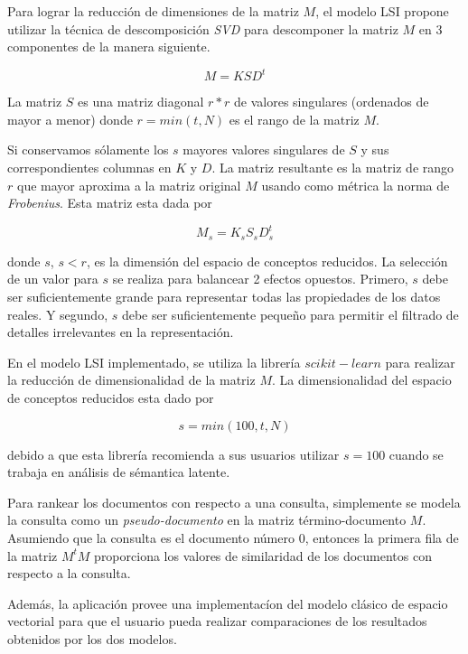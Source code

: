\documentclass[a4paper, 10pt]{article}
\begin{document}
	Para lograr la reducci\'on de dimensiones de la matriz $M$, el modelo LSI propone utilizar la 
	t\'ecnica de descomposici\'on \textit{SVD} para descomponer la matriz $M$ en 3 componentes de la manera siguiente.

	\begin{equation}
		M = KSD^t
	\end{equation}
	
	La matriz $S$ es una matriz diagonal $r*r$ de valores singulares (ordenados de mayor a menor) donde $r = min(t, N)$ es el rango de la matriz $M$.
	
	Si conservamos s\'olamente los $s$ mayores valores singulares de $S$ y sus correspondientes columnas en $K$ y $D$.
	La matriz resultante es la matriz de rango $r$ que mayor aproxima a la matriz original $M$ usando como m\'etrica la
    norma de \textit{Frobenius}. Esta matriz esta dada por
	
	\begin{equation}		
		M_s = K_sS_sD^t_s
	\end{equation}

	donde $s$, $s < r$, es la dimensión del espacio de conceptos reducidos. La selecci\'on de un valor para $s$ se
	realiza para balancear 2 efectos opuestos. Primero, $s$ debe ser suficientemente grande para representar todas las propiedades
	de los datos reales. Y segundo, $s$ debe ser suficientemente peque\~no para permitir el filtrado de detalles irrelevantes
	en la representaci\'on.

	En el modelo LSI implementado, se utiliza la librer\'ia $scikit-learn$ para realizar la reducci\'on de 
	dimensionalidad de la matriz $M$. La dimensionalidad del espacio de conceptos reducidos esta dado por

	\begin{equation}
		s = min(100, t, N)	
	\end{equation}

	debido a que esta librer\'ia recomienda a sus usuarios utilizar $s = 100$ cuando se trabaja en an\'alisis de s\'emantica latente.

	Para rankear los documentos con respecto a una consulta, simplemente se modela la consulta como un 
	\textit{pseudo-documento} en la matriz t\'ermino-documento $M$. Asumiendo que la consulta es el 
	documento n\'umero 0, entonces la primera fila de la matriz $M^tM$ proporciona los valores de similaridad de los documentos 
	con respecto a la consulta.

	Adem\'as, la aplicaci\'on provee una implementac\'ion del modelo cl\'asico de espacio vectorial para que
	el usuario pueda realizar comparaciones de los resultados obtenidos por los dos modelos.
\end{document}
